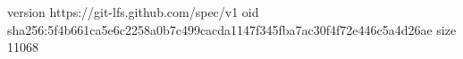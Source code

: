 version https://git-lfs.github.com/spec/v1
oid sha256:5f4b661ca5e6c2258a0b7c499cacda1147f345fba7ac30f4f72e446c5a4d26ae
size 11068
